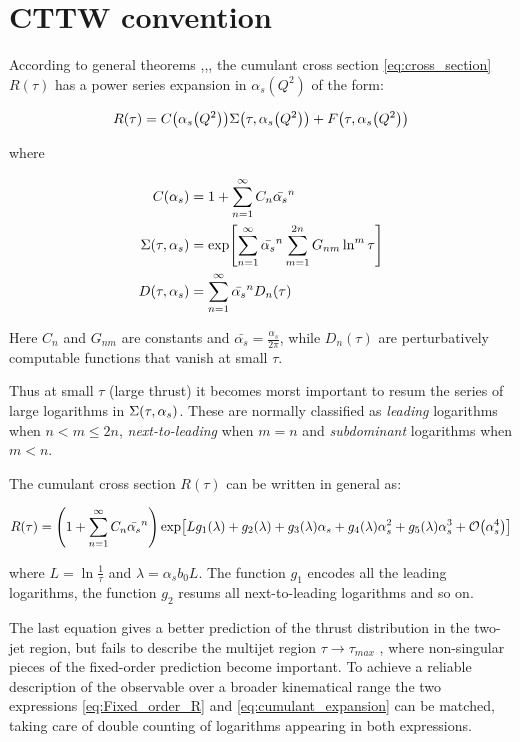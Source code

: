 \documentclass[../main.tex]{subfiles}
\begin{document}
\section{CTTW convention}\label{sec:CTTW convention}

According to general theorems \cite{Block:1937},\cite{Kinoshita:1962ur},\cite{Lee:1964is}, 
the cumulant cross section \cref{eq:cross_section} $R(\tau)$ has a power series expansion in $\alpha_s(Q^2)$ of the form:

\begin{equation}\label{eq:cumulant_expansion}
    R(\tau) =  C\qty(\alpha_s\qty(Q^2))\Sigma\qty(\tau,\alpha_s\qty(Q^2))+F\qty(\tau,\alpha_s\qty(Q^2))
\end{equation}

where 

\begin{align}
    C\qty(\alpha_s) &= 1 + \sum_{n=1}^{\infty} C_n \bar{\alpha_s}^n \\
    \Sigma\qty(\tau,\alpha_s)&= \exp[\sum_{n=1}^\infty \bar{\alpha_s}^n \sum_{m=1}^{2n}G_{nm}\ln^m\tau] \label{eq:sigma}\\
    D(\tau,\alpha_s) &= \sum_{n=1}^{\infty} \bar{\alpha_s}^n D_n(\tau)
\end{align}

Here $C_n$ and $G_{nm}$ are constants and $\bar{\alpha_s} = \frac{\alpha_s}{2\pi}$, while $D_n(\tau)$ are perturbatively computable functions that vanish at small $\tau$.

Thus at small $\tau$ (large thrust) it becomes morst important to resum the series of large logarithms in $\Sigma\qty(\tau,\alpha_s)$.
These are normally classified as \emph{leading} logarithms when $n < m \le 2n$, \emph{next-to-leading} when $m = n$ 
and \emph{subdominant} logarithms when $m < n$. 

The cumulant cross section $R(\tau)$ can be written in general as:

\begin{equation}\label{eq:resummed_R}
    R(\tau) = \qty(1 + \sum_{n=1}^{\infty} C_n \bar{\alpha_s}^n)\exp[L g_1(\lambda)  + g_2(\lambda) + g_3(\lambda) \alpha_s + g_4(\lambda) \alpha_s^2 + g_5(\lambda) \alpha_s^3 + \order{\alpha_s^4}]
\end{equation}

where $L = \ln \frac{1}{\tau}$ and $\lambda = \alpha_s b_0 L$. The function $g_1$ encodes all the leading logarithms, the function $g_2$
resums all next-to-leading logarithms and so on.

The last equation gives a better prediction of the thrust distribution in the two-jet
region, but fails to describe the multijet region $\tau \to \tau_{max}$ , where non-singular pieces of the
fixed-order prediction become important. To achieve a reliable description of the observable
over a broader kinematical range the two expressions \cref{eq:Fixed_order_R} and \cref{eq:cumulant_expansion} can be matched,
taking care of double counting of logarithms appearing in both expressions.
\end{document}
